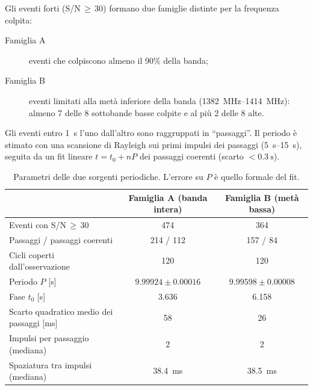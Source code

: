 \documentclass[11pt,a4paper]{article}
\begin{document}
Gli eventi forti (S/N\,$\geq$\,30) formano due famiglie distinte per la frequenza colpita:
\begin{description}
  \item[Famiglia A] eventi che colpiscono almeno il 90\% della banda;
  \item[Famiglia B] eventi limitati alla metà inferiore della banda (\SIrange{1382}{1414}{\mega\hertz}): almeno 7
    delle 8 sottobande basse colpite e al più 2 delle 8 alte.
\end{description}
Gli eventi entro \SI{1}{\second} l'uno dall'altro sono raggruppati in ``passaggi''. Il periodo è stimato con una
scansione di Rayleigh sui primi impulsi dei passaggi (\SIrange{5}{15}{\second}), seguita da un fit lineare
$t=t_0+nP$ dei passaggi coerenti (scarto $<\SI{0.3}{\second}$).

\begin{table}[ht]
\centering
\caption{Parametri delle due sorgenti periodiche. L'errore su $P$ è quello formale del fit.}
\label{tab:radar}
\begin{tabular}{lcc}
\toprule
 & Famiglia A (banda intera) & Famiglia B (metà bassa) \\
\midrule
Eventi con S/N\,$\geq$\,30 & 474 & 364 \\
Passaggi / passaggi coerenti & 214 / 112 & 157 / 84 \\
Cicli coperti dall'osservazione & 120 & 120 \\
Periodo $P$ [s] & $9.99924\pm0.00016$ & $9.99598\pm0.00008$ \\
Fase $t_0$ [s] & 3.636 & 6.158 \\
Scarto quadratico medio dei passaggi [ms] & 58 & 26 \\
Impulsi per passaggio (mediana) & 2 & 2 \\
Spaziatura tra impulsi (mediana) & \SI{38.4}{\milli\second} & \SI{38.5}{\milli\second} \\
\bottomrule
\end{tabular}
\end{table}
\end{document}
